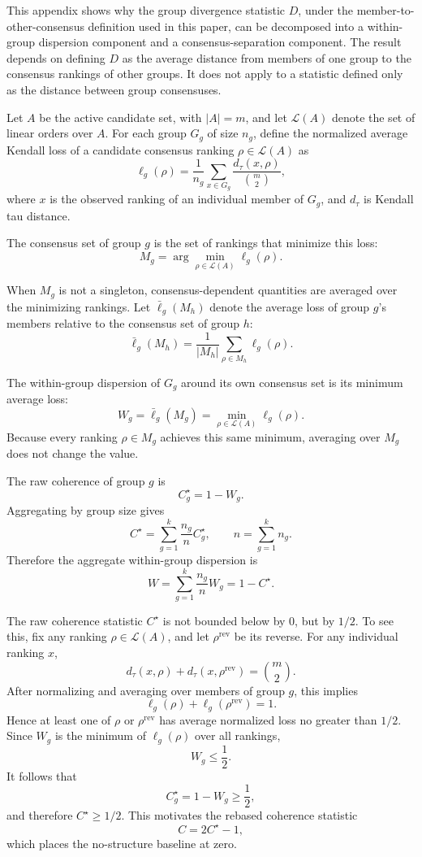 \documentclass[12pt]{article}
\begin{document}
This appendix shows why the group divergence statistic \(D\), under the
member-to-other-consensus definition used in this paper, can be decomposed into
a within-group dispersion component and a consensus-separation component. The
result depends on defining \(D\) as the average distance from members of one
group to the consensus rankings of other groups. It does not apply to a
statistic defined only as the distance between group consensuses.

Let \(A\) be the active candidate set, with \(|A|=m\), and let
\(\mathcal{L}(A)\) denote the set of linear orders over \(A\). For each group
\(G_g\) of size \(n_g\), define the normalized average Kendall loss of a
candidate consensus ranking \(\rho \in \mathcal{L}(A)\) as
\[
\ell_g(\rho)
=
\frac{1}{n_g}
\sum_{x \in G_g}
\frac{d_\tau(x,\rho)}{\binom{m}{2}},
\]
where \(x\) is the observed ranking of an individual member of \(G_g\), and
\(d_\tau\) is Kendall tau distance.

The consensus set of group \(g\) is the set of rankings that minimize this loss:
\[
M_g
=
\arg\min_{\rho \in \mathcal{L}(A)} \ell_g(\rho).
\]

When \(M_g\) is not a singleton, consensus-dependent quantities are averaged
over the minimizing rankings. Let \(\bar{\ell}_g(M_h)\) denote the average loss
of group \(g\)'s members relative to the consensus set of group \(h\):
\[
\bar{\ell}_g(M_h)
=
\frac{1}{|M_h|}
\sum_{\rho \in M_h}
\ell_g(\rho).
\]

The within-group dispersion of \(G_g\) around its own consensus set is its
minimum average loss:
\[
W_g
=
\bar{\ell}_g(M_g)
=
\min_{\rho \in \mathcal{L}(A)} \ell_g(\rho).
\]
Because every ranking \(\rho \in M_g\) achieves this same minimum, averaging
over \(M_g\) does not change the value.

The raw coherence of group \(g\) is
\[
C_g^\star
=
1-W_g.
\]
Aggregating by group size gives
\[
C^\star
=
\sum_{g=1}^{k}
\frac{n_g}{n}C_g^\star,
\qquad
n=\sum_{g=1}^{k}n_g.
\]
Therefore the aggregate within-group dispersion is
\[
W
=
\sum_{g=1}^{k}
\frac{n_g}{n}W_g
=
1-C^\star.
\]

The raw coherence statistic \(C^\star\) is not bounded below by \(0\), but by
\(1/2\). To see this, fix any ranking \(\rho \in \mathcal{L}(A)\), and let
\(\rho^{\mathrm{rev}}\) be its reverse. For any individual ranking \(x\),
\[
d_\tau(x,\rho)
+
d_\tau(x,\rho^{\mathrm{rev}})
=
\binom{m}{2}.
\]
After normalizing and averaging over members of group \(g\), this implies
\[
\ell_g(\rho)
+
\ell_g(\rho^{\mathrm{rev}})
=
1.
\]
Hence at least one of \(\rho\) or \(\rho^{\mathrm{rev}}\) has average normalized
loss no greater than \(1/2\). Since \(W_g\) is the minimum of \(\ell_g(\rho)\)
over all rankings,
\[
W_g \le \frac{1}{2}.
\]
It follows that
\[
C_g^\star
=
1-W_g
\ge
\frac{1}{2},
\]
and therefore \(C^\star \ge 1/2\). This motivates the rebased coherence
statistic
\[
C
=
2C^\star-1,
\]
which places the no-structure baseline at zero.
\end{document}
